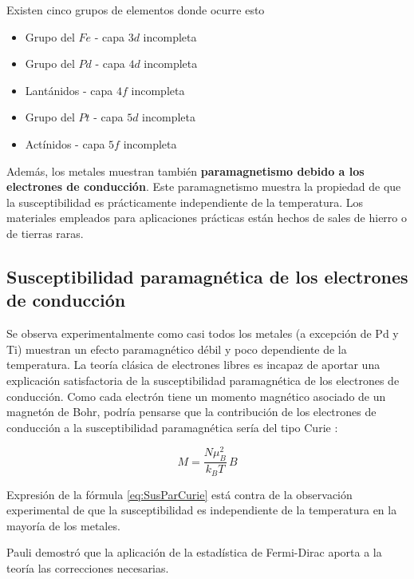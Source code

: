 Existen cinco grupos de elementos donde ocurre esto

\begin{itemize}
	\item Grupo del $Fe$ - capa $3d$ incompleta
	\item Grupo del $Pd$ - capa $4d$ incompleta
	\item Lantánidos - capa $4f$ incompleta
	\item Grupo del $Pt$ - capa $5d$ incompleta
	\item Actínidos - capa $5f$ incompleta
\end{itemize}

Además, los metales muestran también \textbf{paramagnetismo debido a los electrones de conducción}. Este paramagnetismo muestra la propiedad de que la susceptibilidad es prácticamente independiente de la temperatura. Los materiales empleados para aplicaciones prácticas están hechos de sales de hierro o de tierras raras.

\subsection{Susceptibilidad paramagnética de los electrones de conducción}

Se observa experimentalmente como casi todos los metales (a excepción de Pd y Ti) muestran un efecto paramagnético débil y poco dependiente de la temperatura. La teoría clásica de electrones libres es incapaz de aportar una explicación satisfactoria de la susceptibilidad paramagnética de los electrones de conducción. Como cada electrón tiene un momento magnético asociado de un magnetón de Bohr, podría pensarse que la contribución de los electrones de conducción a la susceptibilidad paramagnética sería del tipo Curie :

\begin{equation}
	M=\frac{N\mu_B^{2}}{k_{B}T}\,B
\label{eq:SusParCurie}
\end{equation}

Expresión de la fórmula \ref{eq:SusParCurie} está contra de la observación experimental de que la susceptibilidad es independiente de la temperatura en la mayoría de los metales.

Pauli demostró que la aplicación de la estadística de Fermi-Dirac aporta a la teoría las correcciones necesarias.

